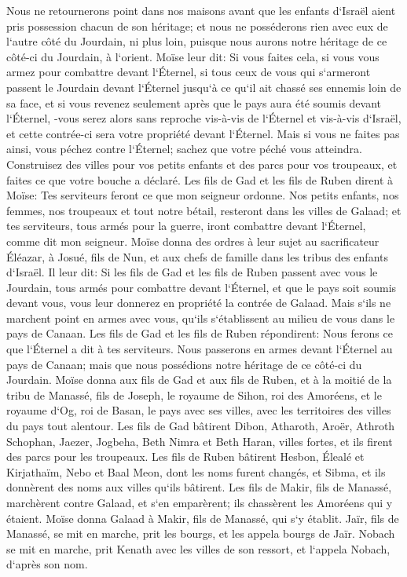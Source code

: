 \verse Nous ne retournerons point dans nos maisons avant que les enfants d`Israël aient pris possession chacun de son héritage; 
\verse et nous ne posséderons rien avec eux de l`autre côté du Jourdain, ni plus loin, puisque nous aurons notre héritage de ce côté-ci du Jourdain, à l`orient. 
\verse Moïse leur dit: Si vous faites cela, si vous vous armez pour combattre devant l`Éternel, 
\verse si tous ceux de vous qui s`armeront passent le Jourdain devant l`Éternel jusqu`à ce qu`il ait chassé ses ennemis loin de sa face, 
\verse et si vous revenez seulement après que le pays aura été soumis devant l`Éternel, -vous serez alors sans reproche vis-à-vis de l`Éternel et vis-à-vis d`Israël, et cette contrée-ci sera votre propriété devant l`Éternel. 
\verse Mais si vous ne faites pas ainsi, vous péchez contre l`Éternel; sachez que votre péché vous atteindra. 
\verse Construisez des villes pour vos petits enfants et des parcs pour vos troupeaux, et faites ce que votre bouche a déclaré. 
\verse Les fils de Gad et les fils de Ruben dirent à Moïse: Tes serviteurs feront ce que mon seigneur ordonne. 
\verse Nos petits enfants, nos femmes, nos troupeaux et tout notre bétail, resteront dans les villes de Galaad; 
\verse et tes serviteurs, tous armés pour la guerre, iront combattre devant l`Éternel, comme dit mon seigneur. 
\verse Moïse donna des ordres à leur sujet au sacrificateur Éléazar, à Josué, fils de Nun, et aux chefs de famille dans les tribus des enfants d`Israël. 
\verse Il leur dit: Si les fils de Gad et les fils de Ruben passent avec vous le Jourdain, tous armés pour combattre devant l`Éternel, et que le pays soit soumis devant vous, vous leur donnerez en propriété la contrée de Galaad. 
\verse Mais s`ils ne marchent point en armes avec vous, qu`ils s`établissent au milieu de vous dans le pays de Canaan. 
\verse Les fils de Gad et les fils de Ruben répondirent: Nous ferons ce que l`Éternel a dit à tes serviteurs. 
\verse Nous passerons en armes devant l`Éternel au pays de Canaan; mais que nous possédions notre héritage de ce côté-ci du Jourdain. 
\verse Moïse donna aux fils de Gad et aux fils de Ruben, et à la moitié de la tribu de Manassé, fils de Joseph, le royaume de Sihon, roi des Amoréens, et le royaume d`Og, roi de Basan, le pays avec ses villes, avec les territoires des villes du pays tout alentour. 
\verse Les fils de Gad bâtirent Dibon, Atharoth, Aroër, 
\verse Athroth Schophan, Jaezer, Jogbeha, 
\verse Beth Nimra et Beth Haran, villes fortes, et ils firent des parcs pour les troupeaux. 
\verse Les fils de Ruben bâtirent Hesbon, Élealé et Kirjathaïm, 
\verse Nebo et Baal Meon, dont les noms furent changés, et Sibma, et ils donnèrent des noms aux villes qu`ils bâtirent. 
\verse Les fils de Makir, fils de Manassé, marchèrent contre Galaad, et s`en emparèrent; ils chassèrent les Amoréens qui y étaient. 
\verse Moïse donna Galaad à Makir, fils de Manassé, qui s`y établit. 
\verse Jaïr, fils de Manassé, se mit en marche, prit les bourgs, et les appela bourgs de Jaïr. 
\verse Nobach se mit en marche, prit Kenath avec les villes de son ressort, et l`appela Nobach, d`après son nom. 

